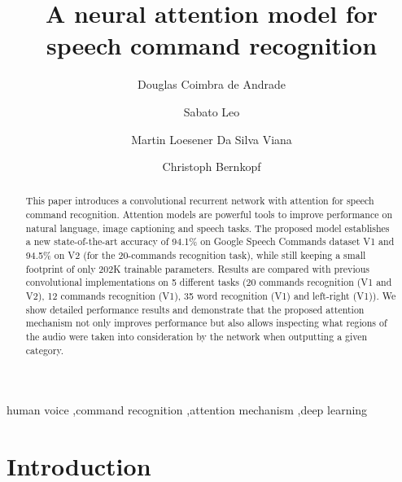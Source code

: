 \documentclass[authoryear, review, 12pt, 3p]{elsarticle}
\begin{document}
\begin{frontmatter}

\title{A neural attention model for speech command recognition}

\author[label1]{Douglas Coimbra de Andrade}
\address[label1]{Laboratory of Voice, Speech and Singing, Federal University of the State of Rio de Janeiro}

\author[label2]{Sabato Leo}
\address[label2]{Adecco Italia S.P.A - GSK Vaccines Srl}

\author[label3]{Martin Loesener Da Silva Viana}
\address[label3]{CERN}

\author[label3]{Christoph Bernkopf}


\begin{abstract}
This paper introduces a convolutional recurrent network with attention for speech command recognition. Attention models are powerful tools to improve performance on natural language, image captioning and speech tasks. The proposed model establishes a new state-of-the-art accuracy of 94.1\% on Google Speech Commands dataset V1 and 94.5\% on V2 (for the 20-commands recognition task), while still keeping a small footprint of only 202K trainable parameters. Results are compared with previous convolutional implementations on 5 different tasks (20 commands recognition (V1 and V2), 12 commands recognition (V1), 35 word recognition (V1) and left-right (V1)). We show detailed performance results and demonstrate that the proposed attention mechanism not only improves performance but also allows inspecting what regions of the audio were taken into consideration by the network when outputting a given category.

\end{abstract}

\begin{keyword}
human voice \sep command recognition \sep attention mechanism \sep deep learning
\end{keyword}

\end{frontmatter}



\section{Introduction}
\label{secIntro}
\end{document}

